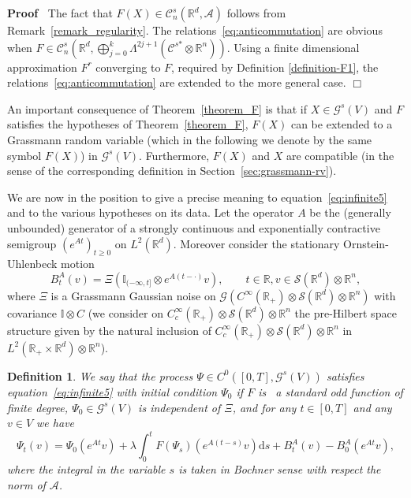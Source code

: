 \documentclass{article}
\newcommand{\asterisk}{\mathord{*}}
\newcommand{\mathd}{\mathrm{d}}
\newenvironment{proof}{\noindent\textbf{Proof\ }}{\hspace*{\fill}$\Box$\medskip}
\newtheorem{definition}[theorem]{Definition}
\begin{document}
\begin{proof}
  The fact that $F (X) \in \mathcal{C}^s_n (\mathbb{R}^d, \mathcal{A})$
  follows from Remark~\ref{remark_regularity}. The
  relations~{\eqref{eq:anticommutation}} are obvious when $F \in
  \mathcal{C}^s_n \left( \mathbb{R}^d, \bigoplus_{j = 0}^k \Lambda^{2 j + 1}
  (\mathcal{C}^{s \asterisk} \otimes \mathbb{R}^n) \right)$. Using a finite
  dimensional approximation $F^r$ converging to $F$, required by Definition
  \ref{definition-F1}, the relations~{\eqref{eq:anticommutation}} are extended
  to the more general case.
\end{proof}

\begin{remark}
  An important consequence of Theorem~\ref{theorem_F} is that if $X \in
  \mathcal{G}^s (V)$ and $F$ satisfies the hypotheses of
  Theorem~\ref{theorem_F}, $F (X)$ can be extended to a Grassmann random
  variable (which in the following we denote by the same symbol $F (X)$) in
  $\mathcal{G}^s (V)$. Furthermore, $F (X)$ and $X$ are compatible (in the
  sense of the corresponding definition in Section~\ref{sec:grassmann-rv}).
\end{remark}

We are now in the position to give a precise meaning to
equation~{\eqref{eq:infinite5}} and to the various hypotheses on its data. Let
the operator $A$ be the (generally unbounded) generator of a strongly
continuous and exponentially contractive semigroup $(e^{A t})_{t \geqslant 0}$
on $L^2 (\mathbb{R}^d)$. Moreover consider the stationary Ornstein-Uhlenbeck
motion
\begin{equation}
  B^A_t (v) = \Xi (\mathbb{I}_{(- \infty, t]} \otimes e^{A (t - \cdot)} v),
  \qquad t \in \mathbb{R}, v \in \mathcal{S} (\mathbb{R}^d) \otimes
  \mathbb{R}^n, \label{eq:ba}
\end{equation}
where $\Xi$ is a Grassmann Gaussian noise on $\mathcal{G} (C^{\infty}
(\mathbb{R}_+) \otimes \mathcal{S} (\mathbb{R}^d) \otimes \mathbb{R}^n)$ with
covariance $\mathbb{I} \otimes C$ (we consider on $C^{\infty}_c (\mathbb{R}_+)
\otimes \mathcal{S} (\mathbb{R}^d) \otimes \mathbb{R}^n$ the pre-Hilbert space
structure given by the natural inclusion of $C^{\infty}_c (\mathbb{R}_+)
\otimes \mathcal{S} (\mathbb{R}^d) \otimes \mathbb{R}^n$ in $L^2 (\mathbb{R}_+
\times \mathbb{R}^d) \otimes \mathbb{R}^n$).

\begin{definition}
  \label{definition_F2}We say that the process $\Psi \in C^0 ([0, T],
  \mathcal{G}^s (V))$ satisfies equation~{\eqref{eq:infinite5}} with initial
  condition $\Psi_0$ if $F$ is \ a standard odd function of finite degree,
  $\Psi_0 \in \mathcal{G}^s (V)$ is independent of $\Xi$, and for any $t \in
  [0, T]$ and any $v \in V$ we have
  \begin{equation}
    \Psi_t (v) = \Psi_0 (e^{A t} v) + \lambda \int_0^t F (\Psi_s) (e^{A (t -
    s)} v) \mathd s + B^A_t (v) - B_0^A (e^{A t} v) \label{eq:infinite2},
  \end{equation}
  where the integral in the variable $s$ is taken in Bochner sense with
  respect the norm of $\mathcal{A}$.
\end{definition}
\end{document}
